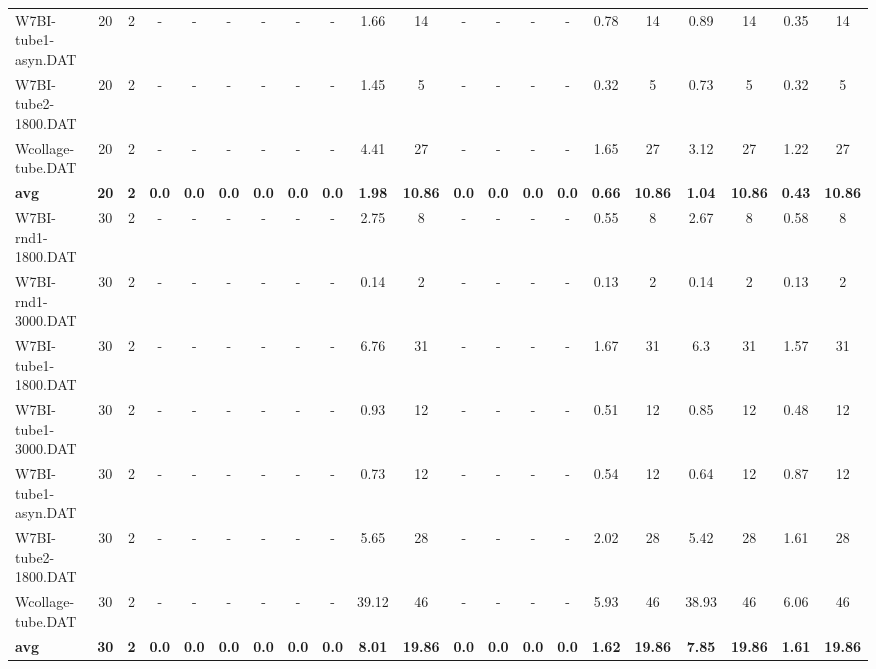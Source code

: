 \begin{sidewaystable}[!ht]
{\begin{tabular}{lcccccccccccccccccccc}
W7BI-tube1-asyn.DAT & 20 & 2 &  - &  - &  - &  - &  - &  - & 1.66 & 14 &  - &  - &  - &  - & 0.78 & 14 & 0.89 & 14 &  \textcolor{blue2}{0.35} & 14 \\
W7BI-tube2-1800.DAT & 20 & 2 &  - &  - &  - &  - &  - &  - & 1.45 & 5 &  - &  - &  - &  - &  \textcolor{blue2}{0.32} & 5 & 0.73 & 5 &  \textcolor{blue2}{0.32} & 5 \\
Wcollage-tube.DAT & 20 & 2 &  - &  - &  - &  - &  - &  - & 4.41 & 27 &  - &  - &  - &  - & 1.65 & 27 & 3.12 & 27 &  \textcolor{blue2}{1.22} & 27 \\
\cline{1-21} \textbf{avg} & \textbf{20} & \textbf{2} & \textbf{0.0} & \textbf{0.0} & \textbf{0.0} & \textbf{0.0} & \textbf{0.0} & \textbf{0.0} & \textbf{1.98} & \textbf{10.86} & \textbf{0.0} & \textbf{0.0} & \textbf{0.0} & \textbf{0.0} & \textbf{0.66} & \textbf{10.86} & \textbf{1.04} & \textbf{10.86} & \textbf{0.43} & \textbf{10.86} \\ \cline{1-21}
W7BI-rnd1-1800.DAT & 30 & 2 &  - &  - &  - &  - &  - &  - & 2.75 & 8 &  - &  - &  - &  - &  \textcolor{blue2}{0.55} & 8 & 2.67 & 8 & 0.58 & 8 \\
W7BI-rnd1-3000.DAT & 30 & 2 &  - &  - &  - &  - &  - &  - & 0.14 & 2 &  - &  - &  - &  - &  \textcolor{blue2}{0.13} & 2 & 0.14 & 2 &  \textcolor{blue2}{0.13} & 2 \\
W7BI-tube1-1800.DAT & 30 & 2 &  - &  - &  - &  - &  - &  - & 6.76 & 31 &  - &  - &  - &  - & 1.67 & 31 & 6.3 & 31 &  \textcolor{blue2}{1.57} & 31 \\
W7BI-tube1-3000.DAT & 30 & 2 &  - &  - &  - &  - &  - &  - & 0.93 & 12 &  - &  - &  - &  - & 0.51 & 12 & 0.85 & 12 &  \textcolor{blue2}{0.48} & 12 \\
W7BI-tube1-asyn.DAT & 30 & 2 &  - &  - &  - &  - &  - &  - & 0.73 & 12 &  - &  - &  - &  - &  \textcolor{blue2}{0.54} & 12 & 0.64 & 12 & 0.87 & 12 \\
W7BI-tube2-1800.DAT & 30 & 2 &  - &  - &  - &  - &  - &  - & 5.65 & 28 &  - &  - &  - &  - & 2.02 & 28 & 5.42 & 28 &  \textcolor{blue2}{1.61} & 28 \\
Wcollage-tube.DAT & 30 & 2 &  - &  - &  - &  - &  - &  - & 39.12 & 46 &  - &  - &  - &  - &  \textcolor{blue2}{5.93} & 46 & 38.93 & 46 & 6.06 & 46 \\
\cline{1-21} \textbf{avg} & \textbf{30} & \textbf{2} & \textbf{0.0} & \textbf{0.0} & \textbf{0.0} & \textbf{0.0} & \textbf{0.0} & \textbf{0.0} & \textbf{8.01} & \textbf{19.86} & \textbf{0.0} & \textbf{0.0} & \textbf{0.0} & \textbf{0.0} & \textbf{1.62} & \textbf{19.86} & \textbf{7.85} & \textbf{19.86} & \textbf{1.61} & \textbf{19.86} \\ \cline{1-21}

\end{tabular}}
\end{sidewaystable}
